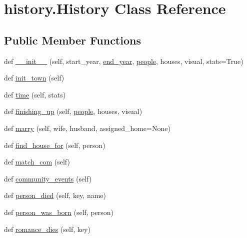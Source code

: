 \hypertarget{classhistory_1_1History}{}\section{history.\+History Class Reference}
\label{classhistory_1_1History}
\subsection*{Public Member Functions}
\begin{DoxyCompactItemize}
\item 
def \hyperlink{classhistory_1_1History_a48dd0ddcbaa81df5c504b853efe38369}{\+\_\+\+\_\+init\+\_\+\+\_\+} (self, start\+\_\+year, \hyperlink{classhistory_1_1History_a570c5cd1423bab2d6b447fa0c3570f9c}{end\+\_\+year}, \hyperlink{classhistory_1_1History_ad2f8c1a1186563676591659e13976bdb}{people}, houses, visual, stats=True)
\item 
def \hyperlink{classhistory_1_1History_ade2a27c1e67a85406d4c6fc1fac9b2fd}{init\+\_\+town} (self)
\item 
def \hyperlink{classhistory_1_1History_a7291cb6a2cf95d0037f86537906d4e7a}{time} (self, stats)
\item 
def \hyperlink{classhistory_1_1History_a9acf2e522de7c36281c2397ad292366a}{finishing\+\_\+up} (self, \hyperlink{classhistory_1_1History_ad2f8c1a1186563676591659e13976bdb}{people}, houses, visual)
\item 
def \hyperlink{classhistory_1_1History_a3c893815cb660baafe0e115872ff9f9e}{marry} (self, wife, husband, assigned\+\_\+home=None)
\item 
def \hyperlink{classhistory_1_1History_ad23e13a94e7693f2da6defa209d5b7a0}{find\+\_\+house\+\_\+for} (self, person)
\item 
def \hyperlink{classhistory_1_1History_a4129474e798b37aded37c8b399c19868}{match\+\_\+com} (self)
\item 
def \hyperlink{classhistory_1_1History_a357b1ce764d10959ac6ae9880d4192ec}{community\+\_\+events} (self)
\item 
def \hyperlink{classhistory_1_1History_af213a7d9320ea5b77abbed16b975fff8}{person\+\_\+died} (self, key, name)
\item 
def \hyperlink{classhistory_1_1History_a601b01e47b4d06560fc08772850d26a3}{person\+\_\+was\+\_\+born} (self, person)
\item 
def \hyperlink{classhistory_1_1History_aaf105cf3c3e4de090d5941284305f6d6}{romance\+\_\+dies} (self, key)
\item 

\end{DoxyCompactItemize}
